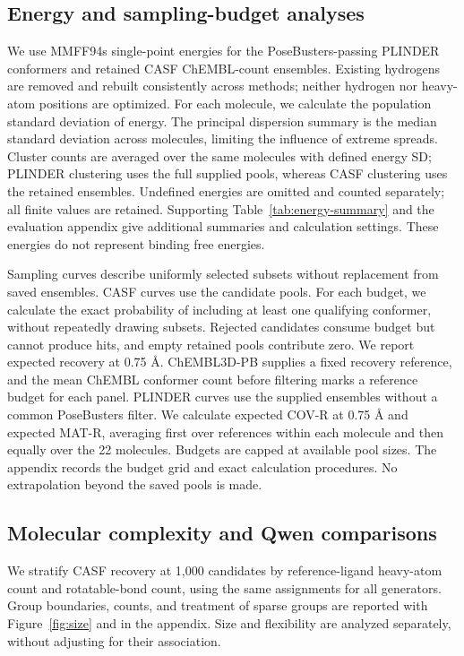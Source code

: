 \subsection{Energy and sampling-budget analyses}

We use MMFF94s single-point energies for the PoseBusters-passing PLINDER conformers
and retained CASF ChEMBL-count ensembles.
Existing hydrogens are removed and rebuilt consistently across methods; neither
hydrogen nor heavy-atom positions are optimized. For each molecule, we calculate the
population standard deviation of energy. The principal dispersion summary is
the median standard deviation across molecules, limiting the influence of extreme
spreads. Cluster counts are averaged over the same molecules with defined energy SD;
PLINDER clustering uses the full supplied pools, whereas CASF clustering uses the retained
ensembles. Undefined energies are omitted and counted separately; all finite values
are retained. Supporting Table~\ref{tab:energy-summary} and the evaluation appendix give additional
summaries and calculation settings. These energies do not represent binding free
energies.

Sampling curves describe uniformly selected subsets without replacement from saved
ensembles. CASF curves use the candidate pools.
For each budget, we calculate the exact probability of including at least one qualifying
conformer, without repeatedly drawing subsets. Rejected candidates consume budget but
cannot produce hits, and empty retained pools contribute zero. We report expected
recovery at 0.75 \AA{}. ChEMBL3D-PB supplies a fixed recovery reference, and the
mean ChEMBL conformer count before filtering marks a reference budget for each panel.
PLINDER curves use the supplied ensembles without a common PoseBusters filter.
We calculate expected COV-R at 0.75 \AA{} and expected MAT-R, averaging first over
references within each molecule and then equally over the 22 molecules.
Budgets are capped at available pool sizes. The appendix records the budget
grid and exact calculation procedures. No extrapolation beyond the saved pools is made.

\subsection{Molecular complexity and Qwen comparisons}

We stratify CASF recovery at 1,000 candidates by reference-ligand heavy-atom count and
rotatable-bond count, using the same assignments for all generators. Group boundaries,
counts, and treatment of sparse groups are reported with Figure~\ref{fig:size}
and in the appendix. Size and flexibility are analyzed separately, without adjusting
for their association.

